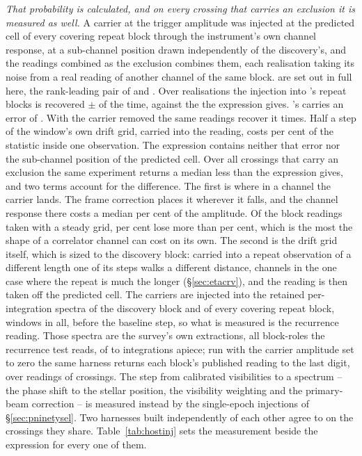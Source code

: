 \emph{That probability is calculated, and on every crossing that carries an
exclusion it is measured as well.} A
carrier at the trigger amplitude was injected at the predicted cell of every
covering repeat block through the instrument's own channel response, at a
sub-channel position drawn independently of the discovery's, and the readings
combined as the exclusion combines them, each realisation taking its noise
from a real reading of another channel of the same block. \RjNMeas{} are set out in full here, the
rank-leading pair of \EvAStar{} and \EvBStar. Over \RjNReal{} realisations
the injection into \EvAStar's repeat blocks is recovered
\RjMeasSx$\pm$\RjErrSx{} of the time, against the \RqPowerTrigSx{} the
expression gives. \EvBStar's carries an error of \RjErrCp. With the carrier removed the same readings recover it
\RjNFalse{} times.
Half a step of the window's own drift grid, carried into the reading, costs
\RjDriftPct{} per cent of the statistic inside one observation. The
expression contains neither that error nor the sub-channel position of the
predicted cell. Over all \HjNMeas{} crossings that carry an exclusion the
same experiment returns a median \HjDevMed{} less than the expression gives,
and two terms account for the difference. The first is where in a channel the
carrier lands. The frame correction places it wherever it falls, and the
channel response there costs a median \HjRespMedPct{} per cent of the
amplitude. Of the \HjNSteady{} block readings taken with a steady grid,
\HjRespOutPct{} per cent lose more than \HjRespBoundPct{} per cent, which is
the most the shape of a correlator channel can cost on its own. The second is the drift grid itself,
which is sized to the discovery block: carried into a repeat observation of a
different length one of its steps walks a different distance, \HjEtaWalkCh{}
channels in the one case where the repeat is much the longer
(\S\ref{sec:etacrv}), and the reading is then taken off the predicted
cell. The carriers are injected into the retained per-integration spectra of
the discovery block and of every covering repeat block, \GpNRoleInj{} windows
in all, before the baseline step, so what is measured is the recurrence
reading. Those spectra are the survey's own extractions, all \GpNRole{}
block-roles the recurrence test reads, of \GpNIntLo{} to \GpNIntHi{}
integrations apiece; run with the carrier amplitude set to zero the same
harness returns each block's published reading to the last digit, over
\GpNullBlock{} readings of \GpNullStar{} crossings. The
step from calibrated visibilities to a spectrum -- the phase shift to the
stellar position, the visibility weighting and the primary-beam correction --
is measured instead by the single-epoch injections of
\S\ref{sec:pninetysel}. Two harnesses built independently of each other agree
to \HjCrossDev{} on the crossings they share.
Table~\ref{tab:hostinj} sets the measurement beside the expression for every
one of them.

